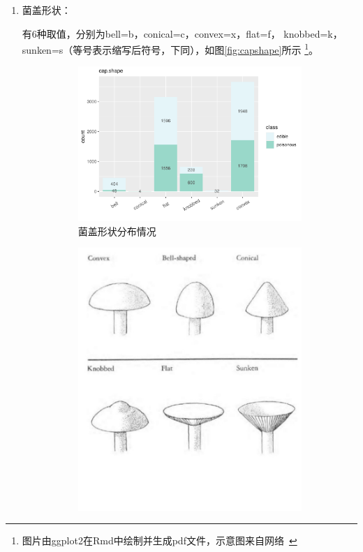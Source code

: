 \documentclass[lang=cn,11pt,a4paper,cite=super]{elegantpaper}
\begin{document}
\begin{enumerate}
   \item 菌盖形状：\par 有6种取值，分别为bell=b，conical=c，convex=x，flat=f，
   knobbed=k，sunken=s（等号表示缩写后符号，下同），如图\ref{fig:capshape}所示
   \footnote{图片由ggplot2在Rmd中绘制并生成pdf文件，示意图来自网络~\cite{pic}}。
   \begin{figure}[hbt]
      \begin{subfigure}[b]{0.69\textwidth}
        \centering
        \includegraphics[width=\linewidth]{img/capshape-1.pdf}  
      \caption{菌盖形状分布情况}
      \end{subfigure}
      \begin{subfigure}[b]{0.3\textwidth}
        \centering
        \includegraphics[width=\linewidth]{img/capshape1.PNG}  

\end{subfigure}
\end{figure}
\end{enumerate}
\end{document}
